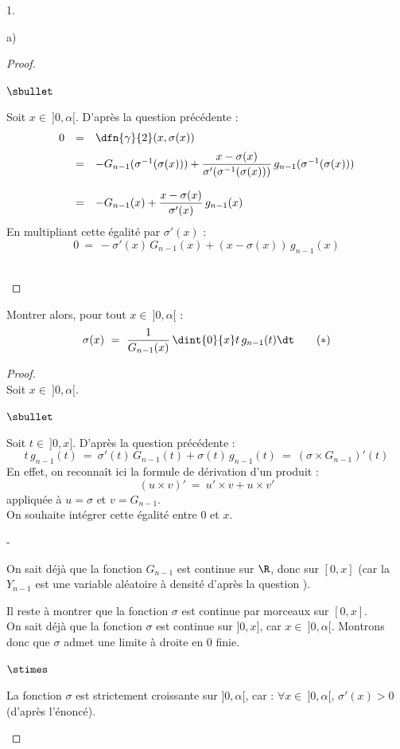 \begin{noliste}{1.}
\begin{noliste}{a)}
\begin{proof}
\begin{noliste}{$\sbullet$}
	
	\item Soit $x \in \ ]0,\alpha[$. D'après la question 
	précédente :
	\[
	  \begin{array}{rcl}
	    0 & = & \dfn{\gamma}{2}(x, \sigma(x))
	    \\[.2cm]
	    & = & - G_{n-1}(\sigma^{-1}(\sigma(x))) + 
	    \dfrac{x - \sigma(x)}{\sigma'(\sigma^{-1}(\sigma(x)))}
	    \, g_{n-1}(\sigma^{-1}(\sigma(x)))
	    \\[.6cm]
	    & = & -G_{n-1}(x) + \dfrac{x - \sigma(x)}{\sigma'(x)}
	    \, g_{n-1}(x)
	  \end{array}
	\]
	En multipliant cette égalité par $\sigma'(x)$ :
	\[
	  0 \ = \ -\sigma'(x) \, G_{n-1}(x) + (x-\sigma(x)) \, 
	  g_{n-1}(x)
	\]
	\conc{D'où : $\forall x \in \ ]0,\alpha[$, $\sigma'(x) \,
	G_{n-1}(x) + \sigma(x) \, g_{n-1}(x) \ = \ x \, 
	g_{n-1}(x)$.}~\\[-1.4cm]
      \end{noliste}
    \end{proof}

    
    \item Montrer alors, pour tout $x \in \ ]0,\alpha[$ : 
    \[
      \sigma(x) \ = \ \dfrac{1}{G_{n-1}(x)} \, \dint{0}{x} t \, 
      g_{n-1}(t) \dt \qquad (*)
    \]
    
    \begin{proof}~\\
      Soit $x \in \ ]0,\alpha[$. 
      \begin{noliste}{$\sbullet$}
	\item Soit $t \in \ ]0,x]$.
	D'après la question précédente :
	\[
	  t \, g_{n-1}(t) \ = \ \sigma'(t) \, G_{n-1}(t) + \sigma(t) \,
	  g_{n-1}(t) \ = \ (\sigma \times G_{n-1})'(t)
	\]
	En effet, on reconnaît ici la formule de dérivation d'un 
	produit :
        \[
          (u \times v)' \ = \ u' \times v + u \times v'
        \]
        appliquée à $u = \sigma$ et $v = G_{n-1}$.\\[.1cm]
	On souhaite intégrer cette égalité entre $0$ et $x$.
	\begin{noliste}{-}
	  \item On sait déjà que la fonction $G_{n-1}$ est continue 
	  sur $\R$, donc sur $[0,x]$ (car la \var $Y_{n-1}$ est une 
	  variable aléatoire à densité d'après la question ).
	  
	  \item Il reste à montrer que la fonction $\sigma$ est 
	  continue par morceaux sur $[0,x]$.\\
	  On sait déjà que la fonction $\sigma$ est continue sur 
	  $]0,x]$, car $x \in \ ]0,\alpha[$. Montrons donc que $\sigma$
	  admet une limite à droite en $0$ finie.
	\end{noliste}
	\begin{liste}{$\stimes$}
	  \item La fonction $\sigma$ est strictement croissante sur 
	  $]0,\alpha[$, car : $\forall x \in \ ]0,\alpha[$, 
	  $\sigma'(x) >0$ (d'après l'énoncé).
	  

\end{liste}
\end{noliste}
\end{proof}
\end{noliste}
\end{noliste}
